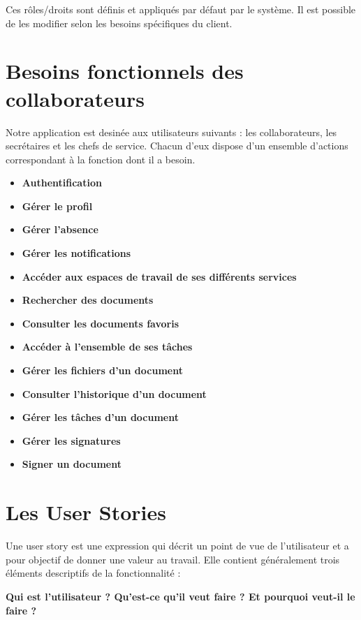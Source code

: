 \begin{small}
  Ces rôles/droits sont définis et appliqués par défaut par le système. Il est possible de les modifier selon les besoins spécifiques du client.
\end{small}


\section{Besoins fonctionnels des collaborateurs}
Notre application est desinée aux utilisateurs suivants : les collaborateurs, les secrétaires et les chefs de service. Chacun d'eux dispose d'un ensemble d'actions correspondant à la fonction dont il a besoin.

\begin{itemize}

\item \textbf{Authentification}
\item \textbf{Gérer le profil}
\item \textbf{Gérer l'absence}
\item \textbf{Gérer les notifications}
\item \textbf{Accéder aux espaces de travail de ses différents services}
\item \textbf{Rechercher des documents}
\item \textbf{Consulter les documents favoris}
\item \textbf{Accéder à l'ensemble de ses tâches}
\item \textbf{Gérer les fichiers d'un document}
\item \textbf{Consulter l'historique d'un document}
\item \textbf{Gérer les tâches d'un document}
\item \textbf{Gérer les signatures}
\item \textbf{Signer un document}
\end{itemize}


\section{Les User Stories}
Une user story est une expression qui décrit un point de vue de l'utilisateur et a pour objectif de donner une valeur au travail. Elle contient généralement trois éléments descriptifs de la fonctionnalité : 

  \textbf{Qui est l'utilisateur ? Qu'est-ce qu'il veut faire ? Et pourquoi veut-il le faire ?}

